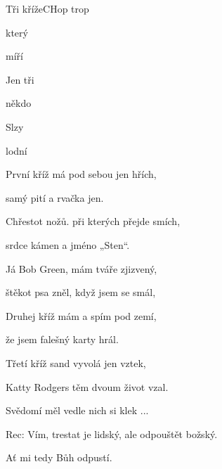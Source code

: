 \begin{song}{Tři kříže}{C}{Hop trop}

\begin{SBVerse}


který 


míří 

\end{SBVerse}

\begin{SBChorus}

Jen tři 

někdo 

Slzy 

lodní 

\end{SBChorus}

\begin{SBVerse}

První kříž má pod sebou jen hřích, 

samý pití a rvačka jen.

Chřestot nožů. při kterých přejde smích, 

srdce kámen a jméno „Sten“.

\end{SBVerse}

\begin{SBVerse}

Já Bob Green, mám tváře zjizvený, 

štěkot psa zněl, když jsem se smál,

Druhej kříž mám a spím pod zemí, 

že jsem falešný karty hrál.

\end{SBVerse}

\begin{SBVerse}

Třetí kříž sand vyvolá jen vztek, 

Katty Rodgers těm dvoum život vzal.

Svědomí měl vedle nich si klek ...

\end{SBVerse}
\begin{SBChorus*}
Rec: Vím, trestat je lidský, ale odpouštět božský. 

Ať mi tedy Bůh odpustí.
\end{SBChorus*}
\end{song}

\pagebreak
